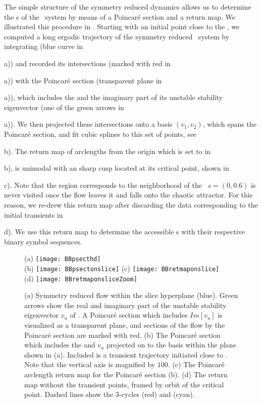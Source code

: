 The simple structure of the symmetry reduced dynamics allows us to
determine the \rpo s of the \twomode\ system by means of a Poincar\'e
section and a return map. We illustrated this procedure in
. Starting with an initial point close to the
\REQV{}{}, we computed a long ergodic trajectory of the symmetry reduced
\twomode\ system by integrating  (blue curve in
\,{a)) and recorded its intersections (marked
with red in \,{a)) with the Poincar\'e section
(transparent plane in \,{a)), which includes
the \REQV{}{} and the imaginary part of its unstable stability
eigenvector (one of the green arrows in \,{a)).
We then projected these intersections onto a basis $(v_1, v_2)$, which
spans the Poincar\'e section, and fit cubic splines to this set of
points, see \,{b). The return map of arclengths
from the origin which is set to \REQV{}{} in
\,{b), is unimodal with an sharp cusp located at its critical point, shown
in \,{c). Note that the region corresponds to
the neighborhood of the \reqv\ $s = (0, 0.6)$ is never visited once the
flow leaves it and falls onto the chaotic attractor. For this reason, we
re-drew this return map after discarding the data corresponding to the
initial transients in \,{d). We use this return
map to determine the accessible \rpo s  with their respective binary
symbol sequences.

\begin{figure}
\centering
  (a) \texttt{[image: BBpsecthd]} \\
  (b) \texttt{[image: BBpsectonslice]}
  (c) \texttt{[image: BBretmaponslice]} \\
  (d) \texttt{[image: BBretmaponsliceZoom]}
\caption{(a) Symmetry reduced flow within the slice hyperplane (blue).
			Green arrows show the real and imaginary part of the unstable stability
			eigenvector $v_u$ of \REQV{}{}. A Poincar\'e section which includes
			$Im[v_u]$ is visualized as a transparent plane, and sections
			of the flow by the Poincar\'e section are marked with red.
		 (b) The Poincar\'e section which includes the \REQV{}{} and $v_u$ projected
			on to the basis within the plane shown in (a). Included is a
            transient trajectory initiated close to \REQV{}{}. Note that
		  	the vertical axis is magnified by $100$.
		 (c) The Poincar\'e arclength return map for the
		    Poincar\'e section (b).
		 (d) The return map without the transient points, framed by
            orbit of the critical point.
		 	Dashed lines show the 3-cycles  (red) and  (cyan).}
\label{fig:psectandretmap}
\end{figure}

}}}}}}}}

